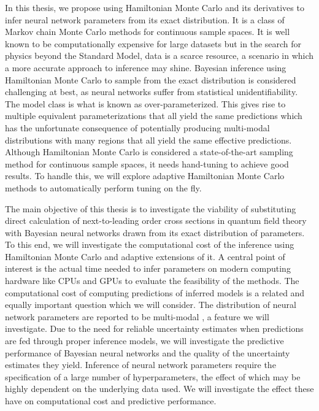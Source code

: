 In this thesis, we propose using Hamiltonian Monte Carlo and its derivatives to infer neural network parameters from its exact distribution. It is a class of Markov chain Monte Carlo methods for continuous sample spaces. It is well known to be computationally expensive for large datasets but in the search for physics beyond the Standard Model, data is a scarce resource, a scenario in which a more accurate approach to inference may shine. Bayesian inference using Hamiltonian Monte Carlo to sample from the exact distribution is considered challenging at best, as neural networks suffer from statistical unidentifiability. The model class is what is known as over-parameterized. This gives rise to multiple equivalent parameterizations that all yield the same predictions which has the unfortunate consequence of potentially producing multi-modal distributions with many regions that all yield the same effective predictions. Although Hamiltonian Monte Carlo is considered a state-of-the-art sampling method for continuous sample spaces, it needs hand-tuning to achieve good results. To handle this, we will explore adaptive Hamiltonian Monte Carlo methods to automatically perform tuning on the fly.

The main objective of this thesis is to investigate the viability of substituting direct calculation of next-to-leading order cross sections in quantum field theory with Bayesian neural networks drawn from its exact distribution of parameters.
To this end, we will investigate the computational cost of the inference using Hamiltonian Monte Carlo and adaptive extensions of it. A central point of interest is the actual time needed to infer parameters on modern computing hardware like CPUs and GPUs to evaluate the feasibility of the methods. The computational cost of computing predictions of inferred models is a related and equally important question which we will consider. The distribution of neural network parameters are reported to be multi-modal \cite{google_bnn_posteriors}, a feature we will investigate. Due to the need for reliable uncertainty estimates when predictions are fed through proper inference models, we will investigate the predictive performance of Bayesian neural networks and the quality of the uncertainty estimates they yield. Inference of neural network parameters require the specification of a large number of hyperparameters, the effect of which may be highly dependent on the underlying data used. We will investigate the effect these have on computational cost and predictive performance.


